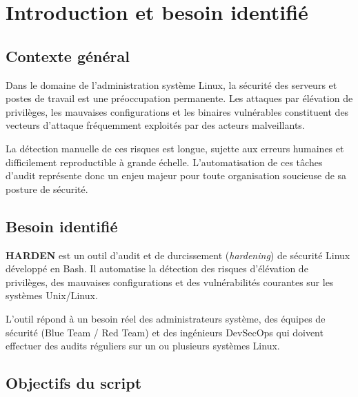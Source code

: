 \documentclass[12pt,a4paper]{article}
\begin{document}
\newpage

\tableofcontents
\newpage

\section{Introduction et besoin identifié}

\subsection{Contexte général}

Dans le domaine de l'administration système Linux, la sécurité des serveurs et postes de travail est une préoccupation permanente. Les attaques par élévation de privilèges, les mauvaises configurations et les binaires vulnérables constituent des vecteurs d'attaque fréquemment exploités par des acteurs malveillants.

La détection manuelle de ces risques est longue, sujette aux erreurs humaines et difficilement reproductible à grande échelle. L'automatisation de ces tâches d'audit représente donc un enjeu majeur pour toute organisation soucieuse de sa posture de sécurité.

\subsection{Besoin identifié}

\textbf{HARDEN} est un outil d'audit et de durcissement (\textit{hardening}) de sécurité Linux développé en Bash. Il automatise la détection des risques d'élévation de privilèges, des mauvaises configurations et des vulnérabilités courantes sur les systèmes Unix/Linux.

L'outil répond à un besoin réel des administrateurs système, des équipes de sécurité (Blue Team / Red Team) et des ingénieurs DevSecOps qui doivent effectuer des audits réguliers sur un ou plusieurs systèmes Linux.

\subsection{Objectifs du script}
\end{document}
